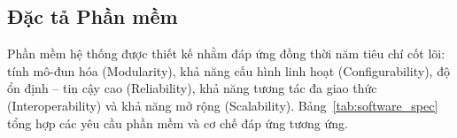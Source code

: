     \subsection{Đặc tả Phần mềm}

        Phần mềm hệ thống được thiết kế nhằm đáp ứng đồng thời năm tiêu chí cốt lõi: tính mô-đun hóa (Modularity), khả năng cấu hình linh hoạt (Configurability), độ ổn định -- tin cậy cao (Reliability), khả năng tương tác đa giao thức (Interoperability) và khả năng mở rộng (Scalability). Bảng~\ref{tab:software_spec} tổng hợp các yêu cầu phần mềm và cơ chế đáp ứng tương ứng.

